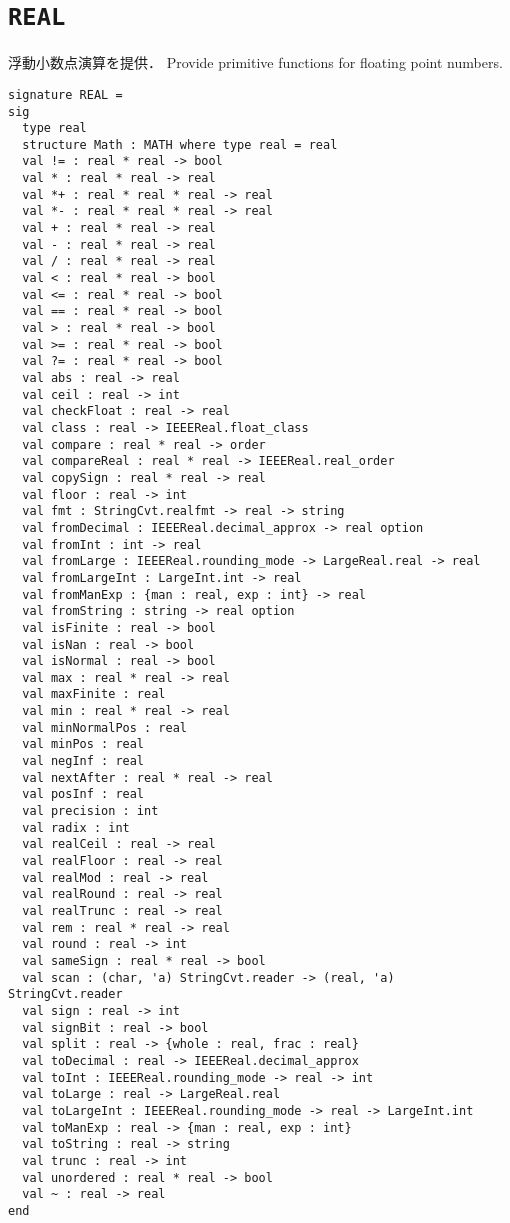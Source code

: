 \documentclass{jbook}
\newcommand{\signature}[2]{
\section{{\tt #1}}\label{section:reference:#2}
}
\begin{document}
\signature{REAL}{REAL}
\ifjp%
	浮動小数点演算を提供．
\else%
	Provide primitive functions for floating point numbers.
\fi%

\begin{verbatim}
signature REAL =
sig
  type real
  structure Math : MATH where type real = real
  val != : real * real -> bool
  val * : real * real -> real
  val *+ : real * real * real -> real
  val *- : real * real * real -> real
  val + : real * real -> real
  val - : real * real -> real
  val / : real * real -> real
  val < : real * real -> bool
  val <= : real * real -> bool
  val == : real * real -> bool
  val > : real * real -> bool
  val >= : real * real -> bool
  val ?= : real * real -> bool
  val abs : real -> real
  val ceil : real -> int
  val checkFloat : real -> real
  val class : real -> IEEEReal.float_class
  val compare : real * real -> order
  val compareReal : real * real -> IEEEReal.real_order
  val copySign : real * real -> real
  val floor : real -> int
  val fmt : StringCvt.realfmt -> real -> string
  val fromDecimal : IEEEReal.decimal_approx -> real option
  val fromInt : int -> real
  val fromLarge : IEEEReal.rounding_mode -> LargeReal.real -> real
  val fromLargeInt : LargeInt.int -> real
  val fromManExp : {man : real, exp : int} -> real
  val fromString : string -> real option
  val isFinite : real -> bool
  val isNan : real -> bool
  val isNormal : real -> bool
  val max : real * real -> real
  val maxFinite : real
  val min : real * real -> real
  val minNormalPos : real
  val minPos : real
  val negInf : real
  val nextAfter : real * real -> real
  val posInf : real
  val precision : int
  val radix : int
  val realCeil : real -> real
  val realFloor : real -> real
  val realMod : real -> real
  val realRound : real -> real
  val realTrunc : real -> real
  val rem : real * real -> real
  val round : real -> int
  val sameSign : real * real -> bool
  val scan : (char, 'a) StringCvt.reader -> (real, 'a) StringCvt.reader
  val sign : real -> int
  val signBit : real -> bool
  val split : real -> {whole : real, frac : real}
  val toDecimal : real -> IEEEReal.decimal_approx
  val toInt : IEEEReal.rounding_mode -> real -> int
  val toLarge : real -> LargeReal.real
  val toLargeInt : IEEEReal.rounding_mode -> real -> LargeInt.int
  val toManExp : real -> {man : real, exp : int}
  val toString : real -> string
  val trunc : real -> int
  val unordered : real * real -> bool
  val ~ : real -> real
end
\end{verbatim}
\end{document}
